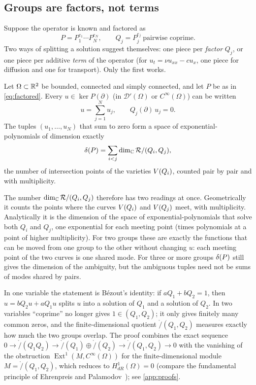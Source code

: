 \subsection{Groups are factors, not terms}\label{sec:factor}
Suppose the operator is known and factored as
\begin{equation}\label{eq:factored}
  P=P_1^{e_1}\cdots P_N^{e_N},\qquad Q_j=P_j^{e_j}\ \text{pairwise coprime}.
\end{equation}
Two ways of splitting a solution suggest themselves: one piece per \emph{factor} $Q_j$, or one piece
per additive \emph{term} of the operator (for $u_t=\nu u_{xx}-cu_x$, one piece for diffusion and one
for transport). Only the first works.

\begin{theorem}\label{thm:factor}
Let $\Omega\subset\mathbb{R}^2$ be bounded, connected and simply connected, and let $P$ be as in
\eqref{eq:factored}. Every $u\in\ker P(\partial)$ (in $\mathcal D'(\Omega)$ or $C^\infty(\Omega)$) can be
written
\begin{equation}\label{eq:decomp}
  u=\sum_{j=1}^N u_j,\qquad Q_j(\partial)\,u_j=0 .
\end{equation}
The tuples $(u_1,\dots,u_N)$ that sum to zero form a space of exponential-polynomials of dimension
exactly
\begin{equation}\label{eq:deltaP}
  \delta(P)=\sum_{i<j}\dim_{\mathbb{C}}\mathcal{R}/(Q_i,Q_j),
\end{equation}
the number of intersection points of the varieties $V(Q_i)$, counted pair by pair and with multiplicity.
\end{theorem}

The number $\dim_{\mathbb{C}}\mathcal{R}/(Q_i,Q_j)$ therefore has two readings at once. Geometrically it counts the points where
the curves $V(Q_i)$ and $V(Q_j)$ meet, with multiplicity. Analytically it is the dimension of the space of
exponential-polynomials that solve both $Q_i$ and $Q_j$, one exponential for each meeting point (times polynomials at a
point of higher multiplicity). For two groups these are exactly the functions that can be moved from one group to the
other without changing $u$: each meeting point of the two curves is one shared mode. For three or more groups $\delta(P)$
still gives the dimension of the ambiguity, but the ambiguous tuples need not be sums of modes shared by pairs.

In one variable the statement is B\'ezout's identity: if $aQ_1+bQ_2=1$, then
$u=bQ_2u+aQ_1u$ splits $u$ into a solution of $Q_1$ and a solution of $Q_2$. In two variables
``coprime'' no longer gives $1\in(Q_1,Q_2)$; it only gives finitely many common zeros, and the
finite-dimensional quotient $\ring/(Q_1,Q_2)$ measures exactly how much the two groups overlap. The
proof combines the exact sequence
$0\to\ring/(Q_1Q_2)\to\ring/(Q_1)\oplus\ring/(Q_2)\to\ring/(Q_1,Q_2)\to0$ with the vanishing of the obstruction
$\operatorname{Ext}^1(M,C^\infty(\Omega))$ for the finite-dimensional module $M=\ring/(Q_1,Q_2)$, which reduces to
$H^1_{dR}(\Omega)=0$ (compare the fundamental principle of Ehrenpreis and Palamodov~\cite{Ehr70,Pal70});
see \cref{app:proofs}.

